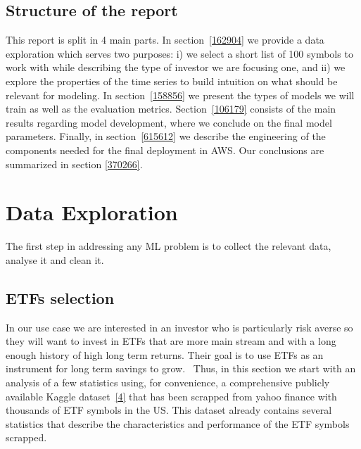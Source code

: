 \documentclass[10pt]{article}
\begin{document}
\hypertarget{structure-of-the-report}{%
\subsection{Structure of the report}}

{\label{686593}}

This report is split in 4 main parts. In
section~{\ref{162904}} we provide a data exploration
which serves two purposes: i) we select a short list of 100 symbols to
work with while describing the type of investor we are focusing one, and
ii) we explore the properties of the time series to build intuition on
what should be relevant for modeling. In
section~{\ref{158856}} we present the types of models we
will train as well as the evaluation metrics.
Section~{\ref{106179}} consists of the main results
regarding model development, where we conclude on the final model
parameters. Finally, in section~{\ref{615612}} we
describe the engineering of the components needed for the final
deployment in AWS. Our conclusions are summarized in section
{\ref{370266}}.~~

\hypertarget{data-exploration}{%
\section{Data Exploration}}

{\label{162904}}

The first step in addressing any ML problem is to collect the relevant
data, analyse it and clean it.

\hypertarget{etfs-selection}{%
\subsection{ETFs selection~}\label{etfs-selection}}

In our use case we are interested in an investor who is particularly
risk averse so they will want to invest in ETFs that are more main
stream and with a long enough history of high long term returns. Their
goal is to use ETFs as an instrument for long term savings to grow.~
Thus, in this section we start with an analysis of a few statistics
using, for convenience, a comprehensive publicly available Kaggle
dataset~\hyperref[csl:4]{[4]} that has been scrapped from yahoo finance
with thousands of ETF symbols in the US. This dataset already contains
several statistics that describe the characteristics and performance of
the ETF symbols scrapped.
\end{document}
